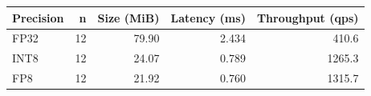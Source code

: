 \begin{tabular}{lrrrr}
\toprule
Precision & n & Size (MiB) & Latency (ms) & Throughput (qps) \\
\midrule
FP32 & 12 & 79.90 & 2.434 & 410.6 \\
INT8 & 12 & 24.07 & 0.789 & 1265.3 \\
FP8 & 12 & 21.92 & 0.760 & 1315.7 \\
\bottomrule
\end{tabular}

